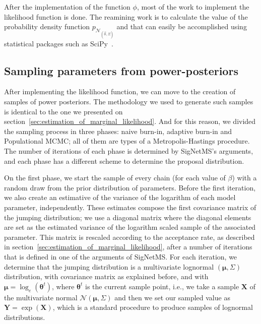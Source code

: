 After the implementation of the function $\phi$, most of the work to
implement the likelihood function is done. The reamining work is to
calculate the value of the probability density function
$p_{\mathcal{N}_{\left(\vec{0}, \Sigma\right)}}$ and that can easily be
accomplished using statistical packages such as
SciPy~\cite{2020SciPy-NMeth}.

\subsection{Sampling parameters from power-posteriors}

After implementing the likelihood function, we can move to the creation
of samples of power posteriors. The methodology we used to generate such
samples is identical to the one we presented on
section~\ref{sec:estimation_of_marginal_likelihood}. And for this
reason, we divided the sampling process in three phases: naive burn-in,
adaptive burn-in and Populational MCMC; all of them are types of a 
Metropolis-Hastings procedure. The number of iterations of each phase is
determined by SigNetMS's arguments, and each phase has a different 
scheme to determine the proposal distribution.

On the first phase, we start the sample of every chain (for each value
of $\beta$) with a random draw from the prior distribution of
parameters. Before the first iteration, we also create an estimative of
the variance of the logarithm of each model parameter, independently.
These estimates compose the first covariance matrix of the jumping 
distribution; we use a diagonal matrix where the diagonal elements are
set as the estimated variance of the logarithm scaled sample of the
associated parameter. This matrix is rescaled according to the
acceptance rate, as described in
section~\ref{sec:estimation_of_marginal_likelihood}, after a number of
iterations that is defined in one of the arguments of SigNetMS. For each
iteration, we determine that the jumping distribution is a multivariate
lognormal $({\bm \mu}, \Sigma)$ distribution, with covariance matrix as
explained before, and with ${\bm \mu} = \log_e({\bm \theta}^t)$, where
${\bm \theta}^t$ is the current sample point, i.e., we take a
sample ${\bm X}$ of the multivariate normal $\mathcal{N}({\bm \mu},
\Sigma)$ and then we set our sampled value  as ${\bm Y} = \exp({\bm
X})$, which is a standard procedure to produce samples of lognormal
distributions.

